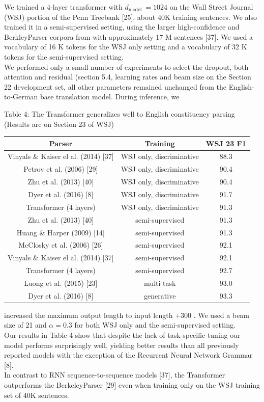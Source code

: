 \documentclass[10pt]{article}
\begin{document}
We trained a 4-layer transformer with $d_{\text {model }}=1024$ on the Wall Street Journal (WSJ) portion of the Penn Treebank [25], about 40K training sentences. We also trained it in a semi-supervised setting, using the larger high-confidence and BerkleyParser corpora from with approximately 17 M sentences [37]. We used a vocabulary of 16 K tokens for the WSJ only setting and a vocabulary of 32 K tokens for the semi-supervised setting.\\
We performed only a small number of experiments to select the dropout, both attention and residual (section 5.4, learning rates and beam size on the Section 22 development set, all other parameters remained unchanged from the English-to-German base translation model. During inference, we

Table 4: The Transformer generalizes well to English constituency parsing (Results are on Section 23 of WSJ)

\begin{center}
\begin{tabular}{c|c|c}
\hline
Parser & Training & WSJ 23 F1 \\
\hline
Vinyals \& Kaiser el al. (2014) [37] & WSJ only, discriminative & 88.3 \\
Petrov et al. (2006) [29] & WSJ only, discriminative & 90.4 \\
Zhu et al. (2013) [40] & WSJ only, discriminative & 90.4 \\
Dyer et al. (2016) [8] & WSJ only, discriminative & 91.7 \\
\hline
Transformer (4 layers) & WSJ only, discriminative & 91.3 \\
\hline
Zhu et al. (2013) [40] & semi-supervised & 91.3 \\
Huang \& Harper (2009) [14] & semi-supervised & 91.3 \\
McClosky et al. (2006) [26] & semi-supervised & 92.1 \\
Vinyals \& Kaiser el al. (2014) [37] & semi-supervised & 92.1 \\
\hline
Transformer (4 layers) & semi-supervised & 92.7 \\
\hline
Luong et al. (2015) [23] & multi-task & 93.0 \\
Dyer et al. (2016) [8] & generative & 93.3 \\
\hline
\end{tabular}
\end{center}

increased the maximum output length to input length +300 . We used a beam size of 21 and $\alpha=0.3$ for both WSJ only and the semi-supervised setting.\\[0pt]
Our results in Table 4 show that despite the lack of task-specific tuning our model performs surprisingly well, yielding better results than all previously reported models with the exception of the Recurrent Neural Network Grammar [8].\\[0pt]
In contrast to RNN sequence-to-sequence models [37], the Transformer outperforms the BerkeleyParser [29] even when training only on the WSJ training set of 40K sentences.
\end{document}

